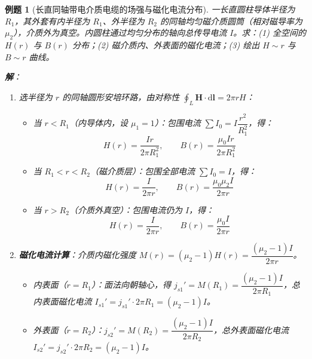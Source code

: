 \documentclass[11pt,a4paper,fontset=fandol]{ctexart}
\newtheorem{example}{例题}[section]
\theoremstyle{remark}
\begin{document}
\begin{example}[长直同轴带电介质电缆的场强与磁化电流分布]
一长直圆柱导体半径为 $R_1$，其外套有内半径为 $R_1$、外半径为 $R_2$ 的同轴均匀磁介质圆筒（相对磁导率为 $\mu_2$），介质外为真空。内圆柱通过均匀分布的轴向总传导电流 $I$。求：(1) 全空间的 $H(r)$ 与 $B(r)$ 分布；(2) 磁介质内、外表面的磁化电流；(3) 绘出 $H \sim r$ 与 $B \sim r$ 曲线。

\textbf{解}：
\begin{enumerate}
    \item 选半径为 $r$ 的同轴圆形安培环路，由对称性 $\oint_L \bm{H}\cdot\mathrm{d}\bm{l} = 2\pi r H$：
    \begin{itemize}
        \item 当 $r < R_1$（内导体内，设 $\mu_1 = 1$）：包围电流 $\sum I_0 = I\dfrac{r^2}{R_1^2}$，得：
        \begin{equation*}
            H(r) = \frac{Ir}{2\pi R_1^2}, \qquad B(r) = \frac{\mu_0 Ir}{2\pi R_1^2}
        \end{equation*}
        \item 当 $R_1 < r < R_2$（磁介质层）：包围全部电流 $\sum I_0 = I$，得：
        \begin{equation*}
            H(r) = \frac{I}{2\pi r}, \qquad B(r) = \frac{\mu_0 \mu_2 I}{2\pi r}
        \end{equation*}
        \item 当 $r > R_2$（介质外真空）：包围电流仍为 $I$，得：
        \begin{equation*}
            H(r) = \frac{I}{2\pi r}, \qquad B(r) = \frac{\mu_0 I}{2\pi r}
        \end{equation*}
    \end{itemize}
    \item \textbf{磁化电流计算}：介质内磁化强度 $M(r) = (\mu_2 - 1)H(r) = \dfrac{(\mu_2 - 1)I}{2\pi r}$。
    \begin{itemize}
        \item 内表面（$r=R_1$）：面法向朝轴心，得 $j_{s1}' = M(R_1) = \dfrac{(\mu_2 - 1)I}{2\pi R_1}$，总内表面磁化电流 $I_{s1}' = j_{s1}' \cdot 2\pi R_1 = (\mu_2 - 1)I$。
        \item 外表面（$r=R_2$）：$j_{s2}' = M(R_2) = \dfrac{(\mu_2 - 1)I}{2\pi R_2}$，总外表面磁化电流 $I_{s2}' = j_{s2}' \cdot 2\pi R_2 = (\mu_2 - 1)I$。
    \end{itemize}
\end{enumerate}

\begin{center}
\end{center}
\end{example}
\end{document}
